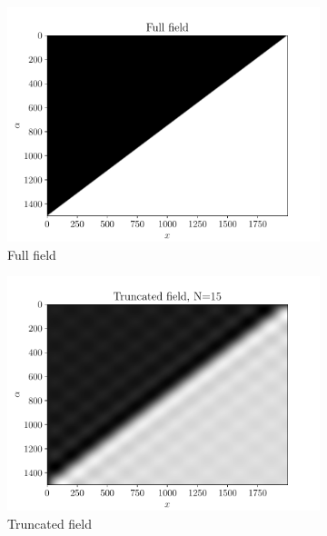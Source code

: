 \begin{figure}
\begin{subfigure}[t]{0.5\linewidth}
    \centering
    \includegraphics[width=\linewidth]{Figures/FullField_Heaviside.pdf}
    \caption{Full field}
\end{subfigure}
  \begin{subfigure}[t]{0.5\linewidth}
    \centering
    \includegraphics[width=\linewidth]{Figures/TruncatedField_15_Heaviside.pdf}
    \caption{Truncated field}
\end{subfigure}  
  \begin{subfigure}[t]{0.5\linewidth}
    \centering

\end{subfigure}
\end{figure}
